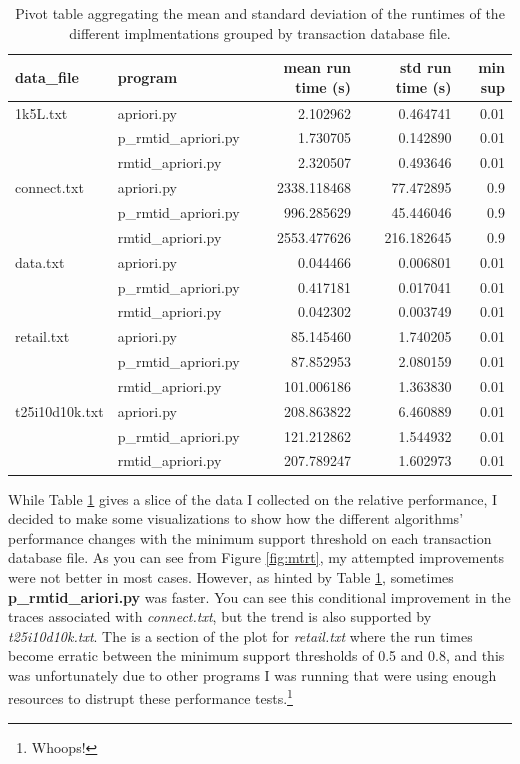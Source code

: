 \documentclass[12 pt]{article}
\begin{document}
\begin{table}[H]
\caption{Pivot table aggregating the mean and standard deviation of the runtimes of the different implmentations grouped by transaction database file.}
\centering
\begin{tabular}{llrrr}
\hline
data\_file & program &    mean run time (s) &    std run time (s) & min sup \\
\hline
1k5L.txt & apriori.py &  2.102962 &  0.464741 & 0.01 \\
         & p\_rmtid\_apriori.py &  1.730705 &  0.142890 & 0.01 \\
         & rmtid\_apriori.py &  2.320507 &  0.493646 & 0.01 \\
connect.txt & apriori.py &  2338.118468 &   77.472895 & 0.9 \\
            & p\_rmtid\_apriori.py &   996.285629 &   45.446046 & 0.9 \\
            & rmtid\_apriori.py &  2553.477626 &  216.182645 & 0.9 \\
data.txt & apriori.py &  0.044466 &  0.006801  & 0.01 \\
         & p\_rmtid\_apriori.py &  0.417181 &  0.017041  & 0.01 \\
         & rmtid\_apriori.py &  0.042302 &  0.003749  & 0.01 \\
retail.txt & apriori.py &   85.145460 &  1.740205  & 0.01 \\
           & p\_rmtid\_apriori.py &   87.852953 &  2.080159  & 0.01 \\
           & rmtid\_apriori.py &  101.006186 &  1.363830  & 0.01 \\
t25i10d10k.txt & apriori.py &  208.863822 &  6.460889  & 0.01 \\
               & p\_rmtid\_apriori.py &  121.212862 &  1.544932  & 0.01 \\
               & rmtid\_apriori.py &  207.789247 &  1.602973  & 0.01 \\
\hline
\end{tabular}
\label{tab:marginal}
\end{table}

While Table \ref{tab:marginal} gives a slice of the data I collected on the relative performance, I decided to make some visualizations to show how the different algorithms' performance changes with the minimum support threshold on each transaction database file. As you can see from Figure \ref{fig:mtrt}, my attempted improvements were not better in most cases. However, as hinted by Table \ref{tab:marginal}, sometimes \textbf{p\_rmtid\_ariori.py} was faster. You can see this conditional improvement in the traces associated with \textit{connect.txt}, but the trend is also supported by \textit{t25i10d10k.txt}. The is a section of the plot for \textit{retail.txt} where the run times become erratic between the minimum support thresholds of 0.5 and 0.8, and this was unfortunately due to other programs I was running that were using enough resources to distrupt these performance tests.\footnote{Whoops!}
\end{document}
